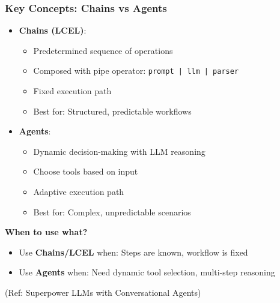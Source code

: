 \begin{frame}\frametitle{Key Concepts: Chains vs Agents}

\begin{itemize}
\item \textbf{Chains (LCEL)}:
    \begin{itemize}
    \item Predetermined sequence of operations
    \item Composed with pipe operator: \texttt{prompt | llm | parser}
    \item Fixed execution path
    \item Best for: Structured, predictable workflows
    \end{itemize}

\item \textbf{Agents}:
    \begin{itemize}
    \item Dynamic decision-making with LLM reasoning
    \item Choose tools based on input
    \item Adaptive execution path
    \item Best for: Complex, unpredictable scenarios
    \end{itemize}
\end{itemize}

\textbf{When to use what?}
\begin{itemize}
\item Use \textbf{Chains/LCEL} when: Steps are known, workflow is fixed
\item Use \textbf{Agents} when: Need dynamic tool selection, multi-step reasoning
\end{itemize}

{\tiny (Ref: Superpower LLMs with Conversational Agents)}
\end{frame}

